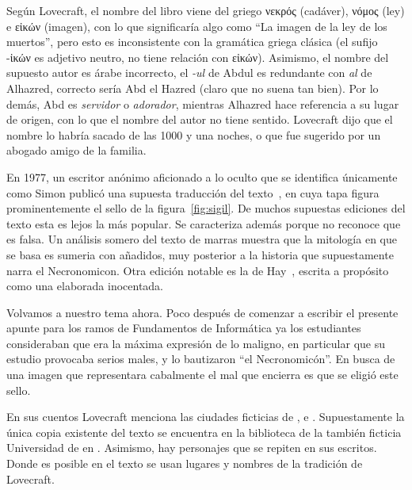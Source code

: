\documentclass[spanish, english, greek]{article}
\begin{document}
  Según Lovecraft,
  el nombre del libro viene del griego
  \textgreek{νεκρός}
  (cadáver),
  \textgreek{νόμος}
  (ley)
  e \textgreek{εἰκών}
  (imagen),
  con lo que significaría algo como ``La imagen de la ley de los muertos'',
  pero esto es inconsistente con la gramática griega clásica
  (el sufijo \textgreek{-ἰκών} es adjetivo neutro,
   no tiene relación con \textgreek{εἰκών}).
  Asimismo,
  el nombre del supuesto autor es árabe incorrecto,
  el \emph{-ul} de Abdul es redundante con \emph{al} de Alhazred,
  correcto sería Abd el Hazred
  (claro que no suena tan bien).
  Por lo demás,
  Abd es \emph{servidor} o \emph{adorador},
  mientras Alhazred hace referencia a su lugar de origen,
  con lo que el nombre del autor no tiene sentido.
  Lovecraft dijo que el nombre lo habría sacado de las 1000 y una noches,
  o que fue sugerido por un abogado amigo de la familia.

  En 1977,
  un escritor anónimo aficionado a lo oculto
  que se identifica únicamente como Simon publicó una supuesta traducción
  del texto~\cite{simon77:_necronomicon},
  en cuya tapa figura prominentemente el sello de la figura~\ref{fig:sigil}.
  De muchos supuestas ediciones del texto esta es lejos la más popular.
  Se caracteriza además porque no reconoce que es falsa.
  Un análisis somero del texto de marras muestra
  que la mitología en que se basa es sumeria con añadidos,
  muy posterior a la historia que supuestamente narra el Necronomicon.
  Otra edición notable es la de Hay~\cite{hay78:_necronomicon},
  escrita a propósito como una elaborada inocentada.

  Volvamos a nuestro tema ahora.
  Poco después de comenzar a escribir el presente apunte
  para los ramos de Fundamentos de Informática
  ya los estudiantes consideraban que era la máxima expresión de lo maligno,
  en particular que su estudio provocaba serios males,
  y lo bautizaron ``el Necronomicón''.
  En busca de una imagen que representara cabalmente el mal que encierra
  es que se eligió este sello.

  En sus cuentos Lovecraft menciona las ciudades ficticias
  de ,
   e .
  Supuestamente la única copia existente del texto se encuentra
  en la biblioteca de la también ficticia
  Universidad de 
  en .
  Asimismo,
  hay personajes que se repiten en sus escritos.
  Donde es posible en el texto se usan lugares y nombres
  de la tradición de Lovecraft.


\end{document}

